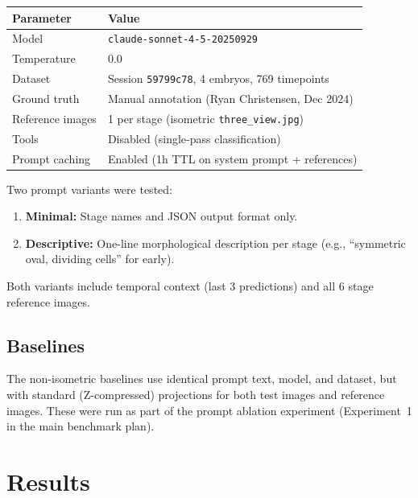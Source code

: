 \documentclass[11pt, a4paper]{article}
\begin{document}
\begin{center}
\begin{tabular}{@{}ll@{}}
\toprule
\textbf{Parameter} & \textbf{Value} \\
\midrule
Model           & \texttt{claude-sonnet-4-5-20250929} \\
Temperature     & 0.0 \\
Dataset         & Session \texttt{59799c78}, 4 embryos, 769 timepoints \\
Ground truth    & Manual annotation (Ryan Christensen, Dec 2024) \\
Reference images & 1 per stage (isometric \texttt{three\_view.jpg}) \\
Tools           & Disabled (single-pass classification) \\
Prompt caching  & Enabled (1h TTL on system prompt + references) \\
\bottomrule
\end{tabular}
\end{center}

Two prompt variants were tested:

\begin{enumerate}[leftmargin=*, itemsep=2pt]
  \item \textbf{Minimal:} Stage names and JSON output format only.
  \item \textbf{Descriptive:} One-line morphological description per stage
    (e.g., ``symmetric oval, dividing cells'' for early).
\end{enumerate}

Both variants include temporal context (last 3 predictions) and all 6 stage
reference images.

\subsection{Baselines}

The non-isometric baselines use identical prompt text, model, and dataset, but
with standard (Z-compressed) projections for both test images and reference
images.  These were run as part of the prompt ablation experiment
(Experiment~1 in the main benchmark plan).

\section{Results}
\end{document}
